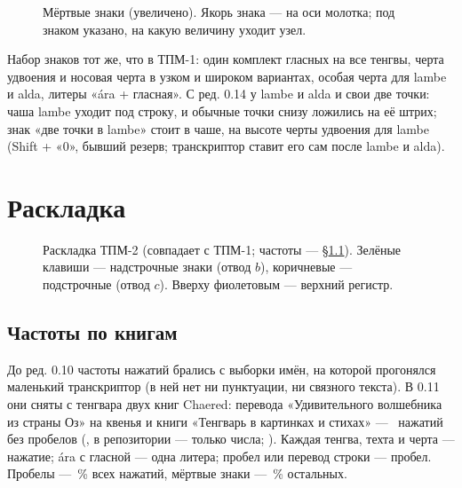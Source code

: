 \begin{figure}[H]
\centering
\setlength\tgem{24mm}
\begin{tikzpicture}[x=\tgu,y=\tgu]

\end{tikzpicture}
\caption{Мёртвые знаки (увеличено). Якорь знака — на оси молотка; под знаком указано, на какую величину уходит узел.}
\end{figure}

Набор знаков тот же, что в ТПМ-1: один комплект гласных на все тенгвы, черта удвоения и носовая черта в узком и широком вариантах, особая черта для lambe и alda, литеры «ára + гласная». С ред. 0.14 у lambe и alda и свои две точки: чаша lambe уходит под строку, и обычные точки снизу ложились на её штрих; знак «две точки в lambe» стоит в чаше, на высоте черты удвоения для lambe (Shift + «0», бывший резерв; транскриптор ставит его сам после lambe и alda).

\section{Раскладка}

\begin{figure}[H]
\centering
\begin{tikzpicture}[x=1mm,y=1mm]

\end{tikzpicture}
\caption{Раскладка ТПМ-2 (совпадает с ТПМ-1; частоты — \S\ref{sec:freq}). Зелёные клавиши — надстрочные знаки (отвод $b$), коричневые — подстрочные (отвод $c$). Вверху фиолетовым — верхний регистр.}
\label{fig:kbd}
\end{figure}

\subsection{Частоты по книгам}
\label{sec:freq}

До ред. 0.10 частоты нажатий брались с выборки имён, на которой прогонялся маленький транскриптор (в ней нет ни пунктуации, ни связного текста). В 0.11 они сняты с тенгвара двух книг Chaered: перевода «Удивительного волшебника из страны Оз» на квенья и книги «Тенгварь в картинках и стихах» — \fqN\ нажатий без пробелов (, в репозитории — только числа; ). Каждая тенгва, техта и черта — нажатие; ára с гласной — одна литера; пробел или перевод строки — пробел. Пробелы — \fqSP\,\% всех нажатий, мёртвые знаки — \fqDead\,\% остальных.

